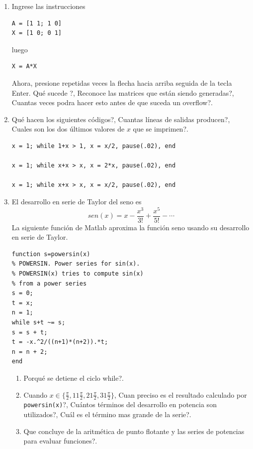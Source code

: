 \documentclass[11pt]{article}
\begin{document}
\begin{enumerate}
\item Ingrese las instrucciones 
\begin{verbatim}
A = [1 1; 1 0]
X = [1 0; 0 1]
\end{verbatim}
luego 
\begin{verbatim}
X = A*X
\end{verbatim}
Ahora, presione repetidas veces la flecha hacia arriba seguida de la tecla Enter. \textquestiondown Qu\'e sucede ?, \textquestiondown Reconoce 
las matrices que est\'an siendo generadas?, \textquestiondown Cuantas veces podra hacer esto antes de que suceda un overflow?.

\item \textquestiondown Qu\'e hacen los siguientes c\'odigos?, \textquestiondown Cuantas l\'ineas de salidas producen?, \textquestiondown Cuales son los dos \'ultimos valores de $x$ que se imprimen?.

\begin{verbatim}
x = 1; while 1+x > 1, x = x/2, pause(.02), end

x = 1; while x+x > x, x = 2*x, pause(.02), end

x = 1; while x+x > x, x = x/2, pause(.02), end
\end{verbatim}

\item El desarrollo en serie de Taylor del seno es 
$$sen(x) = x-\frac{x^3}{3!}+\frac{x^5 }{5!}- \cdots$$
La siguiente funci\'on de Matlab aproxima la funci\'on seno 
usando su desarrollo en serie de Taylor.
\begin{verbatim}
function s=powersin(x)
% POWERSIN. Power series for sin(x).
% POWERSIN(x) tries to compute sin(x)
% from a power series
s = 0;
t = x;
n = 1;
while s+t ~= s;
s = s + t;
t = -x.^2/((n+1)*(n+2)).*t;
n = n + 2;
end
\end{verbatim}
\begin{enumerate}
\item \textquestiondown Porqu\'e se detiene el ciclo while?.
\item Cuando $x\in\{\frac{\pi}{2}, 11\frac{\pi}{2}, 21\frac{\pi}{2}, 31\frac{\pi}{2}\}$, 
\textquestiondown Cuan preciso es el resultado calculado por \texttt{powersin(x)}?, \textquestiondown Cu\'antos t\'erminos del desarrollo en potencia son utilizados?, \textquestiondown Cu\'al es el t\'ermino mas grande de la serie?.
\item \textquestiondown Que concluye de la aritm\'etica de punto flotante y las series de potencias para evaluar funciones?.
\end{enumerate}


\end{enumerate}
\end{document}
